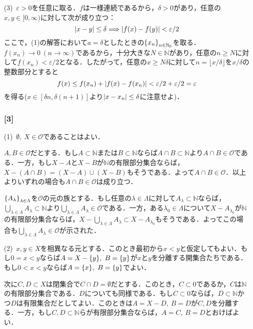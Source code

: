 \documentclass[a4j]{ltjsarticle}
\newcommand{\Nset}{\mathbb{N}}
\newcommand{\1}{\mathbbm{1}}
\numberwithin{equation}{section}
\theoremstyle{definition}
\begin{document}
(3)\ $\varepsilon>0$を任意に取る．$f$は一様連続であるから，$\delta>0$があり，任意の$x,y\in[0,\infty)$に対して次が成り立つ：
\begin{equation}
    \abs{x-y}\leq \delta\Longrightarrow \abs{f(x)-f(y)}<\varepsilon/2
\end{equation}
ここで，(1)の解答において$a=\delta$としたときの$\qty{x_n}_{n\in\Nset_0}$を取る．$f(x_n)\to 0\ (n\to\infty)$であるから，十分大きな$N\in\Nset$があり，任意の$n\geq N$に対して$f(x_n)<\varepsilon/2$となる．したがって，任意の$x\geq N\delta$に対して$n=\lfloor x/\delta\rfloor $を$x/\delta$の整数部分とすると
\begin{equation}
    f(x)\leq f(x_n)+\abs{f(x)-f(x_n)}<\varepsilon/2+\varepsilon/2=\varepsilon
\end{equation}
を得る($x\in [\delta n,\delta(n+1)]$より$\abs{x-x_n}\leq \delta$に注意せよ)．
\subsubsection*{[3]}
(1)\ $\emptyset,\ X\in\mathcal{O}$であることはよい．

$A,B\in \mathcal{O}$だとする．もし$A\subset \Nset$または$B\subset \Nset$ならば$A\cap B\subset \Nset$より$A\cap B\in\mathcal{O}$である．一方，もし$X-A$と$X-B$が$\Nset$の有限部分集合ならば，$X-(A\cap B)=(X-A)\cup(X-B)$もそうである．よって$A\cap B\in \mathcal{O}$．以上よりいずれの場合も$A\cap B\in\mathcal{O}$は成り立つ．

$\qty{A_\lambda}_{\lambda\in\Lambda}$を$\mathcal{O}$の元の族とする．もし任意の$\lambda\in\Lambda$に対して$A_\lambda\subset \Nset$ならば，$\bigcup_{\lambda\in\Lambda}A_\lambda\subset \Nset$より$\bigcup_{\lambda\in\Lambda}A_\lambda\in \mathcal{O}$である．一方，ある$\lambda_0\in\Lambda$について$X-A_{\lambda_0}$が$\Nset$の有限部分集合ならば，$X-\bigcup_{\lambda\in\Lambda}A_\lambda\subset X-A_{\lambda_0}$もそうである．よってこの場合も$\bigcup_{\lambda\in\Lambda}A_\lambda\in\mathcal{O}$が示された．

(2)\ $x,y\in X$を相異なる元とする．このとき最初から$x<y$と仮定してもよい．もし$0=x<y$ならば$A=X-\qty{y},\ B=\qty{y}$が$x$と$y$を分離する開集合たちである．もし$0<x<y$ならば$A=\qty{x},\ B=\qty{y}$でよい．

次に$C,D\subset X$は閉集合で$C\cap D=\emptyset$だとする．このとき，$C\subset \qty{0}$であるか，$C$は$\Nset$の有限部分集合である．$D$についても同様である．もし$C\subset \qty{0}$ならば，$D\subset \Nset$かつ$D$は有限集合だとしてよい．このときは$A=X-D,\ B=D$が$C,D$を分離する．一方，もし$C,D\subset \Nset$らが有限部分集合ならば，$A=C,\ B=D$とおけばよい．
\end{document}
